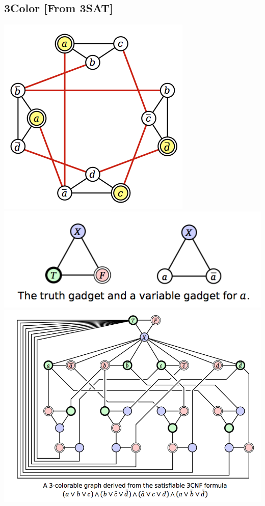 \subsection{3Color [From 3SAT]}
\includegraphics[width=\linewidth]{images/hamcycle.png}
\includegraphics[width=\linewidth]{images/truthgadget.png}
\includegraphics[width=\linewidth]{images/3color.png}

